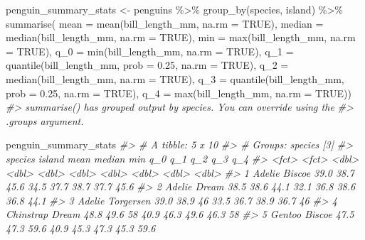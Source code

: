 \documentclass[
  12pt,
]{book}
\newenvironment{Shaded}{\begin{snugshade}}{\end{snugshade}}
\newcommand{\AttributeTok}[1]{\textcolor[rgb]{0.77,0.63,0.00}{#1}}
\newcommand{\CommentTok}[1]{\textcolor[rgb]{0.56,0.35,0.01}{\textit{#1}}}
\newcommand{\ConstantTok}[1]{\textcolor[rgb]{0.00,0.00,0.00}{#1}}
\newcommand{\FloatTok}[1]{\textcolor[rgb]{0.00,0.00,0.81}{#1}}
\newcommand{\FunctionTok}[1]{\textcolor[rgb]{0.00,0.00,0.00}{#1}}
\newcommand{\NormalTok}[1]{#1}
\newcommand{\OtherTok}[1]{\textcolor[rgb]{0.56,0.35,0.01}{#1}}
\newcommand{\SpecialCharTok}[1]{\textcolor[rgb]{0.00,0.00,0.00}{#1}}
\begin{document}
\begin{Shaded}
\begin{Highlighting}[]
\NormalTok{penguin\_summary\_stats }\OtherTok{\textless{}{-}}\NormalTok{ penguins }\SpecialCharTok{\%\textgreater{}\%} 
  \FunctionTok{group\_by}\NormalTok{(species, island) }\SpecialCharTok{\%\textgreater{}\%}
  \FunctionTok{summarise}\NormalTok{(}
    \AttributeTok{mean =} \FunctionTok{mean}\NormalTok{(bill\_length\_mm, }\AttributeTok{na.rm =} \ConstantTok{TRUE}\NormalTok{),}
    \AttributeTok{median =} \FunctionTok{median}\NormalTok{(bill\_length\_mm, }\AttributeTok{na.rm =} \ConstantTok{TRUE}\NormalTok{),}
    \AttributeTok{min =} \FunctionTok{max}\NormalTok{(bill\_length\_mm, }\AttributeTok{na.rm =} \ConstantTok{TRUE}\NormalTok{),}
    \AttributeTok{q\_0 =} \FunctionTok{min}\NormalTok{(bill\_length\_mm, }\AttributeTok{na.rm =} \ConstantTok{TRUE}\NormalTok{),}
    \AttributeTok{q\_1 =} \FunctionTok{quantile}\NormalTok{(bill\_length\_mm, }\AttributeTok{prob =} \FloatTok{0.25}\NormalTok{, }\AttributeTok{na.rm =} \ConstantTok{TRUE}\NormalTok{),}
    \AttributeTok{q\_2 =} \FunctionTok{median}\NormalTok{(bill\_length\_mm, }\AttributeTok{na.rm =} \ConstantTok{TRUE}\NormalTok{),}
    \AttributeTok{q\_3 =} \FunctionTok{quantile}\NormalTok{(bill\_length\_mm, }\AttributeTok{prob =} \FloatTok{0.25}\NormalTok{, }\AttributeTok{na.rm =} \ConstantTok{TRUE}\NormalTok{),}
    \AttributeTok{q\_4 =} \FunctionTok{max}\NormalTok{(bill\_length\_mm, }\AttributeTok{na.rm =} \ConstantTok{TRUE}\NormalTok{))}
\CommentTok{\#\textgreater{} \textasciigrave{}summarise()\textasciigrave{} has grouped output by \textquotesingle{}species\textquotesingle{}. You can override using the}
\CommentTok{\#\textgreater{} \textasciigrave{}.groups\textasciigrave{} argument.}

\NormalTok{penguin\_summary\_stats}
\CommentTok{\#\textgreater{} \# A tibble: 5 x 10}
\CommentTok{\#\textgreater{} \# Groups:   species [3]}
\CommentTok{\#\textgreater{}   species   island     mean median   min   q\_0   q\_1   q\_2   q\_3   q\_4}
\CommentTok{\#\textgreater{}   \textless{}fct\textgreater{}     \textless{}fct\textgreater{}     \textless{}dbl\textgreater{}  \textless{}dbl\textgreater{} \textless{}dbl\textgreater{} \textless{}dbl\textgreater{} \textless{}dbl\textgreater{} \textless{}dbl\textgreater{} \textless{}dbl\textgreater{} \textless{}dbl\textgreater{}}
\CommentTok{\#\textgreater{} 1 Adelie    Biscoe     39.0   38.7  45.6  34.5  37.7  38.7  37.7  45.6}
\CommentTok{\#\textgreater{} 2 Adelie    Dream      38.5   38.6  44.1  32.1  36.8  38.6  36.8  44.1}
\CommentTok{\#\textgreater{} 3 Adelie    Torgersen  39.0   38.9  46    33.5  36.7  38.9  36.7  46  }
\CommentTok{\#\textgreater{} 4 Chinstrap Dream      48.8   49.6  58    40.9  46.3  49.6  46.3  58  }
\CommentTok{\#\textgreater{} 5 Gentoo    Biscoe     47.5   47.3  59.6  40.9  45.3  47.3  45.3  59.6}
\end{Highlighting}
\end{Shaded}
\end{document}
